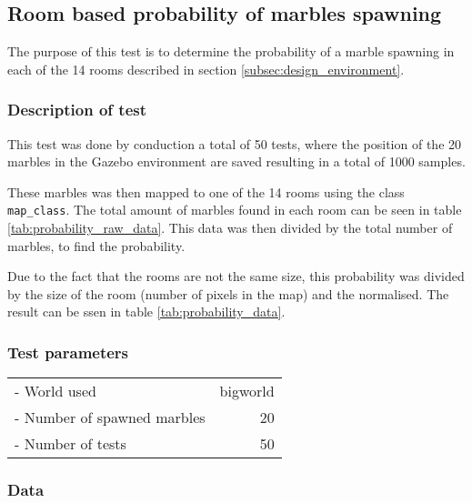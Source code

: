 \documentclass[../Head/Main.tex]{subfiles}
\begin{document}
\subsection{Room based probability of marbles spawning}
\label{subsec:probability_test}
The purpose of this test is to determine the probability of a marble spawning in each of the 14 rooms described in section \ref{subsec:design_environment}.

\subsubsection{Description of test}
This test was done by conduction a total of 50 tests, where the position of the 20 marbles in the Gazebo environment are saved resulting in a total of 1000 samples.\par 
These marbles was then mapped to one of the 14 rooms using the  class \texttt{map\_class}. The total amount of marbles found in each room can be seen in table \ref{tab:probability_raw_data}. This data was then divided by the total number of marbles, to find the probability.\par 
Due to the fact that the rooms are not the same size, this probability was divided by the size of the room (number of pixels in the map) and the normalised. The result can be ssen in table \ref{tab:probability_data}.

\subsubsection{Test parameters}
\begin{tabular}{l r}
	- World used                & bigworld\\	
	- Number of spawned marbles & 20\\
	- Number of tests           & 50
\end{tabular}

\subsubsection{Data}
\end{document}
